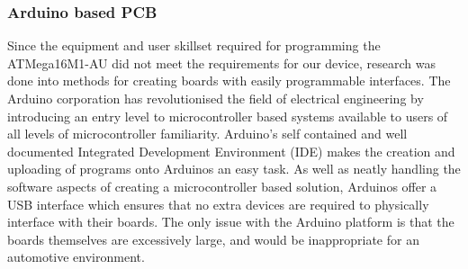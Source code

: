\subsubsection{Arduino based PCB}
Since the equipment and user skillset required for programming the ATMega16M1-AU did not meet the requirements for our device, research was done into methods for creating boards with easily programmable interfaces. The Arduino corporation has revolutionised the field of electrical engineering by introducing an entry level to microcontroller based systems available to users of all levels of microcontroller familiarity. Arduino's self contained and well documented Integrated Development Environment (IDE) makes the creation and uploading of programs onto Arduinos an easy task. As well as neatly handling the software aspects of creating a microcontroller based solution, Arduinos offer a USB interface which ensures that no extra devices are required to physically interface with their boards\cite{ARDUINO_gettingstarted}. The only issue with the Arduino platform is that the boards themselves are excessively large, and would be inappropriate for an automotive environment. 

